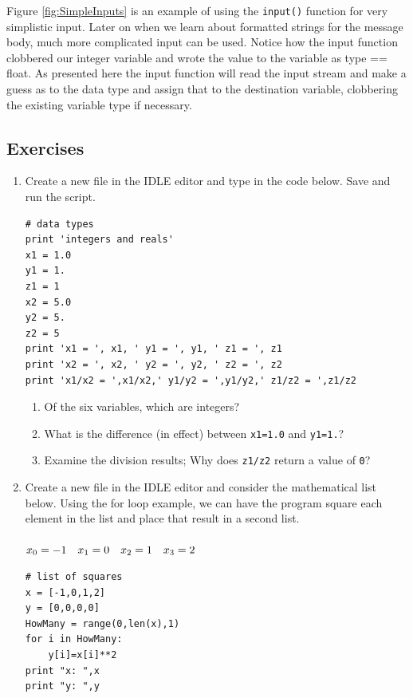 Figure \ref{fig:SimpleInputs} is an example of using the \texttt{input()} function for very simplistic input.  Later on when we learn about formatted strings for the message body, much more complicated input can be used.   Notice how the input function clobbered our integer variable and wrote the value to the variable as type == float.  As presented here the input function will read the input stream and make a guess as to the data type and assign that to the destination variable, clobbering the existing variable type if necessary.

\clearpage
\subsection{Exercises}
\begin{enumerate}

\item Create a new file in the IDLE editor and type in the code below.  Save and run the script.
\begin{verbatim}
# data types
print 'integers and reals'
x1 = 1.0
y1 = 1.
z1 = 1
x2 = 5.0
y2 = 5.
z2 = 5
print 'x1 = ', x1, ' y1 = ', y1, ' z1 = ', z1
print 'x2 = ', x2, ' y2 = ', y2, ' z2 = ', z2
print 'x1/x2 = ',x1/x2,' y1/y2 = ',y1/y2,' z1/z2 = ',z1/z2
\end{verbatim}
\begin{enumerate} 
 \item Of the six variables, which are integers?
 \item What is the difference (in effect) between \texttt{x1=1.0} and \texttt{y1=1.}?
 \item Examine the division results; Why does \texttt{z1/z2} return a value of \texttt{0}?
\end{enumerate}

\item Create a new file in the IDLE editor and consider the mathematical list below.  Using the for loop example, we can have the program square each element in the list and place that result in a second list.\\
~\\
\begin{math}
x_0 = -1 ~~~ x_1 = 0 ~~~ x_2 = 1 ~~~ x_3 = 2\\
\end{math}\\
\begin{verbatim}
# list of squares
x = [-1,0,1,2]
y = [0,0,0,0]
HowMany = range(0,len(x),1)
for i in HowMany:
    y[i]=x[i]**2
print "x: ",x
print "y: ",y
\end{verbatim}


\end{enumerate}
